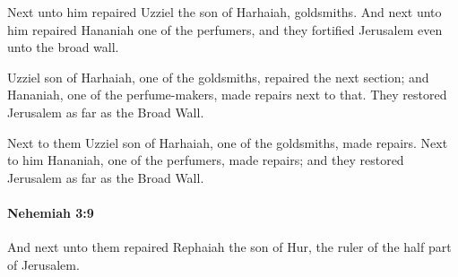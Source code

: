 			\begin{versebox}
					\item[BHS] 
					\item[LXX] 
					\item[ASV] Next unto him repaired Uzziel the son of Harhaiah, goldsmiths. And next unto him repaired Hananiah one of the perfumers, and they fortified Jerusalem even unto the broad wall.
					\item[NIV] Uzziel son of Harhaiah, one of the goldsmiths, repaired the next section; and Hananiah, one of the perfume-makers, made repairs next to that. They restored Jerusalem as far as the Broad Wall.
					\item[NRSV] Next to them Uzziel son of Harhaiah, one of the goldsmiths, made repairs. Next to him Hananiah, one of the perfumers, made repairs; and they restored Jerusalem as far as the Broad Wall.
			\end{versebox}

		\paragraph{Nehemiah 3:9} %
			\label{NEHEMIAH-3-9}

			And next unto them repaired Rephaiah the son of Hur, the ruler of the half part of Jerusalem.

